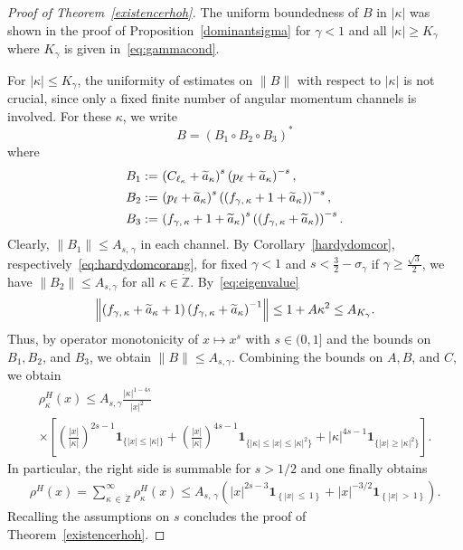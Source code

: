 \documentclass[10pt]{amsart}
\theoremstyle{definition}
\newcommand*\gz{\mathbb{Z}}
\newcommand*\zp{\dot{\gz}}
\newcommand{\one}{\mathbf{1}}
\let\oldtilde\tilde
\renewcommand*{\tilde}[1]{\mathchoice{\widetilde{#1}}{\widetilde{#1}}{\oldtilde{#1}}{\oldtilde{#1}}}
\begin{document}
\begin{proof}[{Proof of Theorem~\ref{existencerhoh}}]
The uniform boundedness of $B$ in $|\kappa|$ was shown in the proof of Proposition~\ref{dominantsigma} for $\gamma<1$ and all $|\kappa|\geq K_\gamma$ where $K_\gamma$ is given in~\eqref{eq:gammacond}.

For $|\kappa|\leq K_\gamma$, the uniformity of estimates on $\|B\|$ with respect to $|\kappa|$ is not crucial, since only a fixed finite number of angular momentum channels is involved. For these $\kappa$, we write
\begin{equation}
B=\left(B_1\circ B_2\circ B_3\right)^*
\end{equation}
where
\begin{align*}
B_1 :=\, &\left(C_{\ell_\kappa}+\tilde a_\kappa\right)^s \left(p_\ell+\tilde a_\kappa\right)^{-s}, \\
B_2 :=\, &\left(p_\ell+\tilde a_\kappa\right)^{s}\left(\left(f_{\gamma,\,\kappa}+1+\tilde a_\kappa\right)\right)^{-s},\\
B_3 :=\, &\left(f_{\gamma,\,\kappa}+1+\tilde a_\kappa\right)^{s}\left(\left(f_{\gamma,\,\kappa}+\tilde a_\kappa\right)\right)^{-s}.
\end{align*}
Clearly, $\|B_1\|\leq A_{s,\,\gamma}$ in each channel. By Corollary~\ref{hardydomcor}, respectively~\eqref{eq:hardydomcorang}, for fixed $\gamma<1$ and $s<\frac32-\sigma_\gamma$ if $\gamma\geq\frac{\sqrt3}2$, we have $\|B_2\|\leq A_{s,\gamma}$ for all $\kappa\in\zp$. By~\eqref{eq:eigenvalue}
\begin{equation}
\left\|\left(f_{\gamma,\,\kappa}+\tilde a_\kappa+1\right)\left(f_{\gamma,\,\kappa}+\tilde a_\kappa\right)^{-1}\right\| \leq 1 + A \kappa^2 \leq A_{K_\gamma}.
\end{equation}
Thus, by operator monotonicity of $x\mapsto x^s$ with $s\in(0,1]$ and the bounds on $B_1,B_2$, and $B_3$, we obtain $ \|B\|\leq A_{s,\gamma}$. Combining the bounds on $A,B$, and $C$, we obtain
\begin{multline*}
\rho_{\kappa}^H(x) \leq A_{s,\gamma} \frac{|\kappa|^{1-4s}}{|x|^2}\\
\times \left[\left(\frac{|x|}{|\kappa|}\right)^{2s-1}\one_{\{|x| \leq |\kappa|\}}+\left(\frac{|x|}{|\kappa|}\right)^{4s-1}\one_{\{|\kappa| \leq |x| \leq |\kappa|^2\}} + |\kappa|^{4s-1}\one_{\{|x| \geq |\kappa|^2\}}\right].
\end{multline*}
In particular, the right side is summable for $s>1/2$ and one finally obtains
\begin{align*}
\rho^H(x) = \sum_{\kappa\,\in\,\zp}^\infty \rho_\kappa^H(x)
\leq A_{s,\,\gamma} \left(|x|^{2s-3}\one_{\left\{|x|\,\leq\,1\right\}} + |x|^{-3/2}\one_{\left\{|x|\,>\,1\right\}}\right).
\end{align*}
Recalling the assumptions on $s$ concludes the proof of Theorem~\ref{existencerhoh}.
\end{proof}
\end{document}
